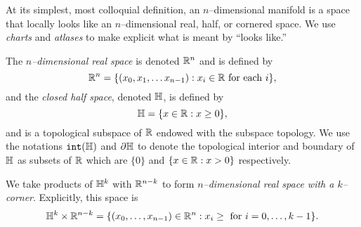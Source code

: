 At its simplest, most colloquial definition, an $n$--dimensional manifold is a space that locally looks like an $n$--dimensional real, half, or cornered space.
We use \emph{charts} and \emph{atlases} to make explicit what is meant by ``looks like.''


\begin{defn}
	The \emph{$n$--dimensional real space} is denoted $\mathbb{R}^n$ and is defined by
	\[
		\mathbb{R}^n=\{(x_0,x_1,\dots x_{n-1}):x_i\in\mathbb{R}\textrm{ for each }i\},
	\]
	and the \emph{closed half space}, denoted $\mathbb{H}$, is defined by
	\[
		\mathbb{H}=\{x\in\mathbb{R}:x\geq 0\},
	\]
	and is a topological subspace of $\mathbb{R}$ endowed with the subspace topology.
	We use the notations $\mathtt{int}(\mathbb{H})$ and $\partial \mathbb{H}$ to denote the topological interior and boundary of $\mathbb{H}$ as subsets of $\mathbb{R}$ which are $\{0\}$ and $\{x\in\mathbb{R}:x>0\}$ respectively.
	
	We take products of $\mathbb{H}^k$ with $\mathbb{R}^{n-k}$ to form \emph{$n$--dimensional real space with a $k$--corner}.
	Explicitly, this space is
	\[
		\mathbb{H}^k\times\mathbb{R}^{n-k} = \{(x_0,\dots,x_{n-1})\in\mathbb{R}^n:x_i\geq\textrm{ for } i=0,\dots,k-1\}.
	\]
\end{defn}

